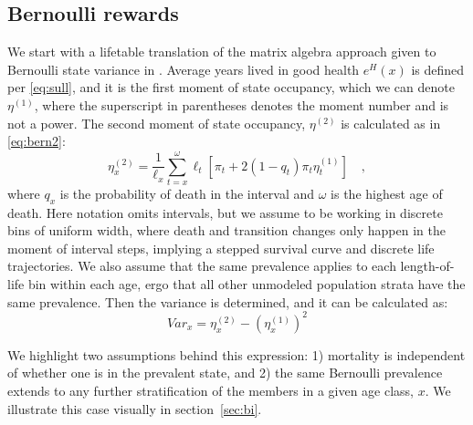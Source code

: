 \documentclass{bmcart}
\begin{document}

\subsection{Bernoulli rewards}
We start with a lifetable translation of the matrix algebra approach given to Bernoulli state variance in \cite{caswell2018matrix}. Average years lived in good health $e^H(x)$ is defined per \eqref{eq:sull}, and it is the first moment of state occupancy, which we can denote $\eta^{(1)}$, where the superscript in parentheses denotes the moment number and is not a power. The second moment of state occupancy, $\eta^{(2)}$ is calculated as in \eqref{eq:bern2}:
\begin{equation}
\label{eq:bern2}
\eta^{(2)}_x = \frac{1}{\ell_x} \sum_{t=x}^\omega \ell_t\left[\pi_t + 2(1-q_t)\pi_t\eta^{(1)}_t\right] \quad \mathrm{,}
\end{equation}
where $q_x$ is the probability of death in the interval and $\omega$ is the highest age of death. Here notation omits intervals, but we assume to be working in discrete bins of uniform width, where death and transition changes only happen in the moment of interval steps, implying a stepped survival curve and discrete life trajectories. We also assume that the same prevalence applies to each length-of-life bin within each age, ergo that all other unmodeled population strata have the same prevalence. Then the variance is determined, and it can be calculated as:
\begin{equation}
\label{eq:var2}
Var_x = \eta^{(2)}_x - (\eta^{(1)}_x)^2
\end{equation}

We highlight two assumptions behind this expression: 1) mortality is independent of whether one is in the prevalent state, and 2) the same Bernoulli prevalence extends to any further stratification of the members in a given age class, $x$. We illustrate this case visually in section~\ref{sec:bi}.
\end{document}
